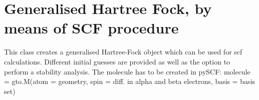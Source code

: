 \documentclass[letterpaper,10pt,english]{sphinxmanual}
\begin{document}
\label{\detokenize{GHF:module-hf.GHF}}

\chapter{Generalised Hartree Fock, by means of SCF procedure}
\label{\detokenize{GHF:generalised-hartree-fock-by-means-of-scf-procedure}}\label{\detokenize{GHF::doc}}
This class creates a generalised Hartree-Fock object which can be used for scf calculations. Different initial guesses
are provided as well as the option to perform a stability analysis.
The molecule has to be created in pySCF:
molecule = gto.M(atom = geometry, spin = diff. in alpha and beta electrons, basis = basis set)
\end{document}
